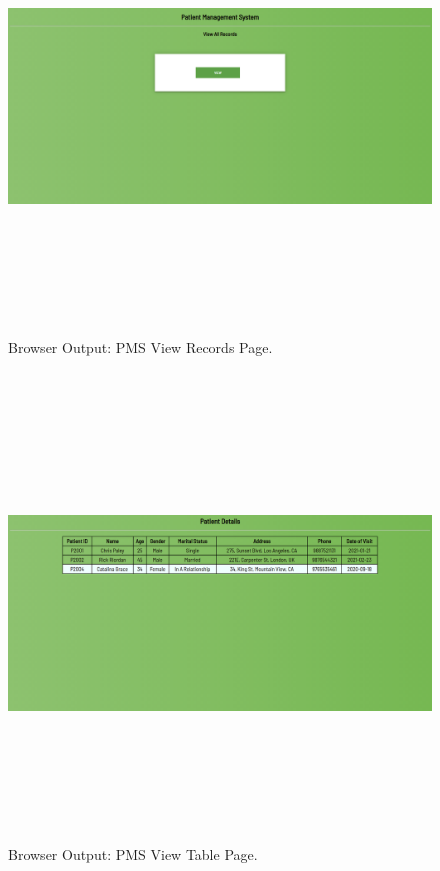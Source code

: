 \documentclass[12pt, a4]{article}
\begin{document}
\newpage
\subsection*{}
\begin{figure}[h]
\centering
\caption{Browser Output: PMS View Records Page.}
\includegraphics[height=12cm, width=16cm]{Output/PMSView0.png}
\end{figure}

\newpage
\subsection*{}
\begin{figure}[h]
\centering
\caption{Browser Output: PMS View Table Page.}
\includegraphics[height=12cm, width=16cm]{Output/PMSView3.png}
\end{figure}
\end{document}
